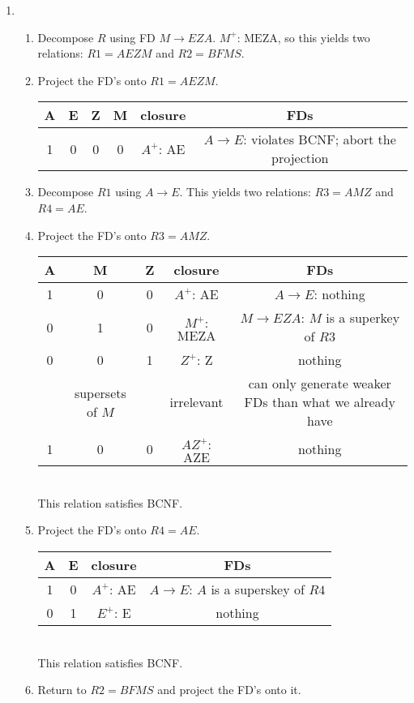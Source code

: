 \documentclass{csc_assignment2}
\begin{document}
\begin{description}
\begin{enumerate}
\begin{enumerate}
\item \begin{enumerate}
\item Decompose $R$ using FD $M \rightarrow EZA$. $M^{+}$: $\text{MEZA}$, so this yields two relations: $R1 = AEZM$ and $R2 = BFMS$.
\item Project the FD's onto $R1 = AEZM$. \\[5pt]
\begin{tabular}{ |c|c|c|c|c|c| } 
 \hline
 A & E & Z & M & closure & FDs \\
 \hline
 1 & 0 & 0 & 0 & $A^{+}$: $\text{AE}$ & $A \rightarrow E$: violates BCNF; abort the projection \\ 
 \hline
\end{tabular}
\item Decompose $R1$ using $A \rightarrow E$. This yields two relations: $R3 = AMZ$ and $R4 = AE$.
\item Project the FD's onto $R3 = AMZ$. \\[5pt]
\begin{tabular}{ |c|c|c|c|c| } 
 \hline
 A & M & Z & closure & FDs \\
 \hline
 1 & 0 & 0 & $A^{+}$: $\text{AE}$ & $A \rightarrow E$: nothing \\ 
 \hline
 0 & 1 & 0 & $M^{+}$: $\text{MEZA}$ & $M \rightarrow EZA$: $M$ is a superkey of $R3$ \\ 
 \hline
 0 & 0 & 1 & $Z^{+}$: $\text{Z}$ & nothing \\
 \hline
 & supersets of $M$ && irrelevant & can only generate weaker FDs than what we already have \\
 \hline
 1 & 0 & 0 & $AZ^{+}$: $\text{AZE}$ & nothing \\
 \hline
\end{tabular} \\[3pt] This relation satisfies BCNF. 
\item Project the FD's onto $R4 = AE$. \\[5pt]
\begin{tabular}{ |c|c|c|c| } 
 \hline
 A & E & closure & FDs \\
 \hline
 1 & 0 & $A^{+}$: $\text{AE}$ & $A \rightarrow E$: $A$ is a superskey of $R4$ \\ 
 \hline
 0 & 1 & $E^{+}$: $\text{E}$ & nothing \\ 
 \hline
\end{tabular} \\[3pt] This relation satisfies BCNF. 
\item Return to $R2 = BFMS$ and project the FD's onto it. \\[5pt]

\end{enumerate}
\end{enumerate}
\end{enumerate}
\end{description}
\end{document}
